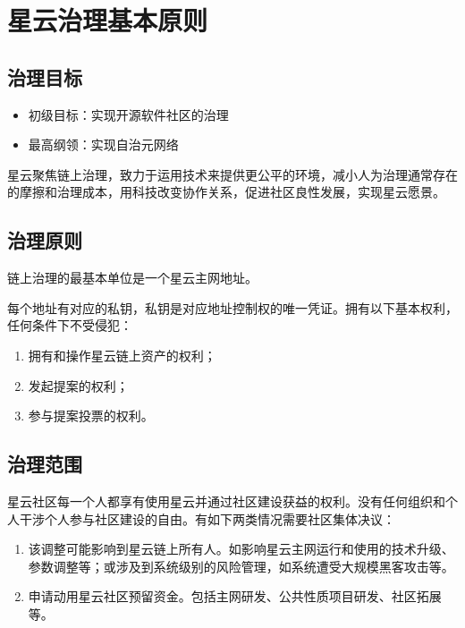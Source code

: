 \section{星云治理基本原则}
\subsection{治理目标}
\begin{itemize}
\item 初级目标：实现开源软件社区的治理
\item 最高纲领：实现自治元网络
\end{itemize}
星云聚焦链上治理，致力于运用技术来提供更公平的环境，减小人为治理通常存在的摩擦和治理成本，用科技改变协作关系，促进社区良性发展，实现星云愿景。

\subsection{治理原则}
链上治理的最基本单位是一个星云主网地址。

每个地址有对应的私钥，私钥是对应地址控制权的唯一凭证。拥有以下基本权利，任何条件下不受侵犯：
\begin{enumerate}
	\item 拥有和操作星云链上资产的权利；
\item 发起提案的权利；
\item 参与提案投票的权利。
\end{enumerate}

\subsection{治理范围}
星云社区每一个人都享有使用星云并通过社区建设获益的权利。没有任何组织和个人干涉个人参与社区建设的自由。有如下两类情况需要社区集体决议：
\begin{enumerate}
	\item 该调整可能影响到星云链上所有人。如影响星云主网运行和使用的技术升级、参数调整等；或涉及到系统级别的风险管理，如系统遭受大规模黑客攻击等。
	\item 申请动用星云社区预留资金。包括主网研发、公共性质项目研发、社区拓展等。
\end{enumerate}

